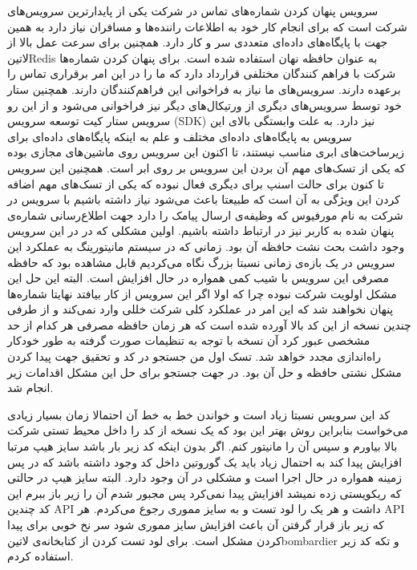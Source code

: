 \documentclass[a4]{report}
\begin{document}
سرویس پنهان کردن شماره‌های تماس در شرکت یکی از پایدارترین سرویس‌های شرکت است
که برای انجام کار خود به اطلاعات راننده‌ها و مسافران نیاز دارد
به همین جهت با پایگاه‌های داده‌ای متعددی سر و کار دارد.
همچنین برای سرعت عمل بالا از ‌لاتین{Redis} به عنوان حافظه نهان استفاده شده است.
برای پنهان کردن شماره‌ها شرکت با فراهم کنندگان مختلفی قرارداد دارد که ما را در این امر برقراری تماس را برعهده دارند.
سرویس‌های ما نیاز به فراخوانی این فراهم‌کنندگان دارند.
همچنین ستار خود توسط سرویس‌های دیگری از ورتیکال‌های دیگر نیز فراخوانی می‌شود و از این رو سرویس ستار
کیت توسعه سرویس (SDK) نیز دارد.
به علت وابستگی بالای این سرویس به پایگاه‌های داده‌ای مختلف و علم به اینکه پایگاه‌های داده‌ای
برای زیرساخت‌های ابری مناسب نیستند، تا اکنون این سرویس روی ماشین‌های مجازی بوده که یکی از تسک‌های مهم آن بردن این سرویس بر روی ابر است.
همچنین این سرویس تا کنون برای حالت اسنپ برای دیگری فعال نبوده که یکی از تسک‌های مهم اضافه کردن این ویژگی به آن است که طبیعتا باعث
می‌شود نیاز داشته باشیم با سرویس در شرکت به نام مورفیوس که وظیفه‌ی ارسال پیامک را دارد جهت اطلاع‌رسانی شماره‌ی پنهان شده به کاربر نیز در ارتباط داشته باشیم.
اولین مشکلی که در در این سرویس وجود داشت بحث نشت حافظه آن بود.
زمانی که در سیستم مانیتورینگ به عملکرد این سرویس در یک بازه‌ی زمانی نسبتا بزرگ نگاه می‌کردیم قابل مشاهده بود که حافظه مصرفی این سرویس با شیب کمی همواره در حال
افزایش است.
البته این حل این مشکل اولویت شرکت نبوده چرا که اولا اگر این سرویس از کار بیافتد نهایتا شماره‌ها پنهان نخواهند شد
که این امر در عملکرد کلی شرکت خللی وارد نمی‌کند و از طرفی چندین نسخه از این کد بالا آورده شده است که هر زمان حافظه مصرفی هر کدام از حد مشخصی عبور کرد
آن نسخه با توجه به تنظیمات صورت گرفته به طور خودکار راه‌اندازی مجدد خواهد شد.
تسک اول من جستجو در کد و تحقیق جهت پیدا کردن مشکل نشتی حافظه و حل آن بود.
در جهت جستجو برای حل این مشکل اقدامات زیر انجام شد.

کد این سرویس نسبتا زیاد است و خواندن خط به خط آن احتمالا زمان بسیار زیادی می‌خواست بنابراین روش بهتر این بود که یک نسخه از کد را داخل محیط تستی شرکت بالا بیاورم و
سپس آن را مانیتور کنم. اگر بدون اینکه کد زیر بار باشد سایز هیپ مرتبا افزایش پیدا کند به احتمال زیاد باید یک گوروتین داخل کد وجود داشته باشد
که در پس زمینه همواره در حال اجرا است و مشکلی در آن وجود دارد.
البته سایز هیپ در حالتی که ریکويستی زده نمیشد افزایش پیدا نمی‌کرد پس مجبور شدم آن را زیر باز ببرم این کد چندین API داشت و هر یک را لود تست و به سایز مموری رجوع می‌کردم.
هر API که زیر باز قرار گرفتن آن باعث افزایش سایز مموری شود سر نخ خوبی برای پیدا کردن مشکل است.
برای لود تست کردن از کتابخانه‌ی ‌لاتین{bombardier} و تکه کد زیر استفاده کردم.
\end{document}

